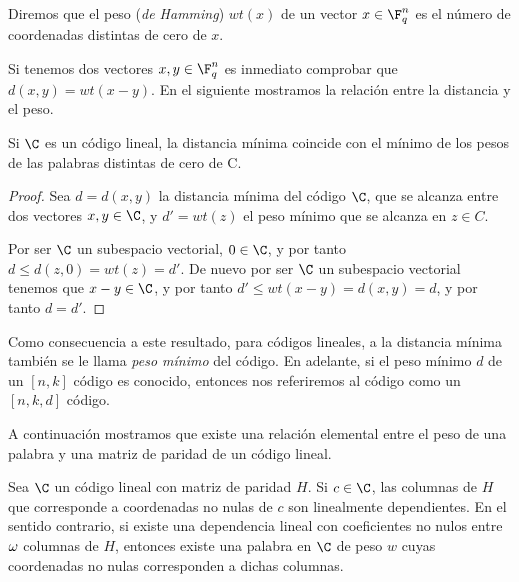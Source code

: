 \begin{definition}
Diremos que el peso (\textit{de Hamming}) \(wt(x)\) de un vector \(x \in \F_q^n\) es el número de coordenadas distintas de cero de \(x\).
\end{definition}

Si tenemos dos vectores \(x, y \in \F_q^n\) es inmediato comprobar que \(d(x,y) = wt(x - y)\). En el siguiente mostramos la relación entre la distancia y el peso.

\begin{proposition}
Si \(\C\) es un  código lineal, la distancia mínima coincide con el mínimo de los pesos de las palabras distintas de cero de C.

\begin{proof}
Sea \(d = d(x,y)\) la distancia mínima del código \(\C\), que se alcanza entre dos vectores \(x, y \in \C\), y \(d' = wt(z)\) el peso mínimo que se alcanza en \(z \in C\).

Por ser \(\C\) un subespacio vectorial,  \(0 \in \C\), y por tanto  \(d \leq d(z, 0) = wt(z) = d'\). De nuevo por ser \(\C\) un subespacio vectorial tenemos que \(x-y \in \C\), y por tanto  \(d' \leq wt(x-y) = d(x,y) = d\), y por tanto \(d = d'\).
\end{proof}
\end{proposition}

Como consecuencia a este resultado, para códigos lineales, a la distancia mínima también se le llama \textit{peso mínimo} del código. En adelante, si el peso mínimo \(d\) de un \([n,k]\) código es conocido, entonces nos referiremos al código como un \([n,k,d]\) código.

A continuación mostramos que existe una relación elemental entre el peso de una palabra y una matriz de paridad de un código lineal.

\begin{proposition}
    Sea \(\C\) un código lineal con matriz de paridad \(H\). Si \(c \in \C\), las columnas de \(H\) que corresponde a coordenadas no nulas de \(c\) son linealmente dependientes. En el sentido contrario, si existe una dependencia lineal con coeficientes no nulos entre \(\omega\) columnas de  \(H\), entonces existe una palabra en \(\C\) de peso \(w\) cuyas coordenadas no nulas corresponden a dichas columnas.
\end{proposition}

